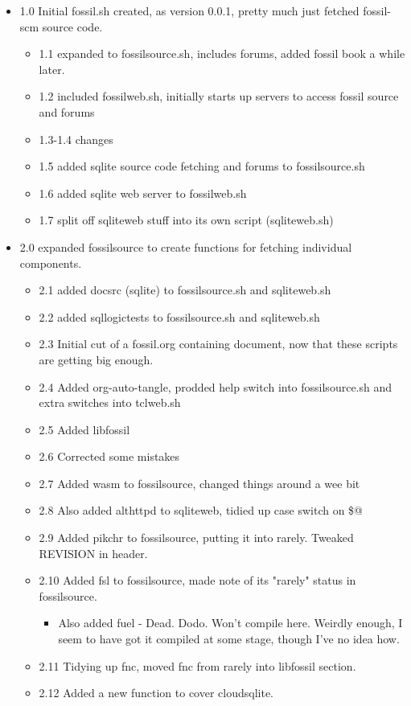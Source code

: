\documentclass[11pt]{article}
\begin{document}
\begin{itemize}
\item 1.0 Initial fossil.sh created, as version 0.0.1, pretty much just fetched fossil-scm source
code.
\begin{itemize}
\item 1.1 expanded to fossilsource.sh, includes forums, added fossil book a while later.
\item 1.2 included fossilweb.sh, initially starts up servers to access fossil source and forums
\item 1.3-1.4 changes
\item 1.5 added sqlite source code fetching and forums to fossilsource.sh
\item 1.6 added sqlite web server to fossilweb.sh
\item 1.7 split off sqliteweb stuff into its own script (sqliteweb.sh)
\end{itemize}
\item 2.0 expanded fossilsource to create functions for fetching individual components.
\begin{itemize}
\item 2.1 added docsrc (sqlite) to fossilsource.sh and sqliteweb.sh
\item 2.2 added sqllogictests to fossilsource.sh and sqliteweb.sh

\item 2.3 Initial cut of a fossil.org containing document, now that these scripts are getting big
enough.
\item 2.4 Added org-auto-tangle, prodded help switch into fossilsource.sh and extra switches into
tclweb.sh
\item 2.5 Added libfossil
\item 2.6 Corrected some mistakes
\item 2.7 Added wasm to fossilsource, changed things around a wee bit
\item 2.8 Also added althttpd to sqliteweb, tidied up case switch on \$@
\item 2.9 Added pikchr to fossilsource, putting it into rarely. Tweaked REVISION in header.
\item 2.10 Added fsl to fossilsource, made note of its "rarely" status in fossilsource.  
\begin{itemize}
\item Also added fuel - Dead. Dodo. Won't compile here. Weirdly enough, I seem to have got it
compiled at some stage, though I've no idea how.
\end{itemize}
\item 2.11 Tidying up fnc, moved fnc from rarely into libfossil section.
\item 2.12 Added a new function to cover cloudsqlite.
\end{itemize}
\end{itemize}
\newpage
\end{document}
